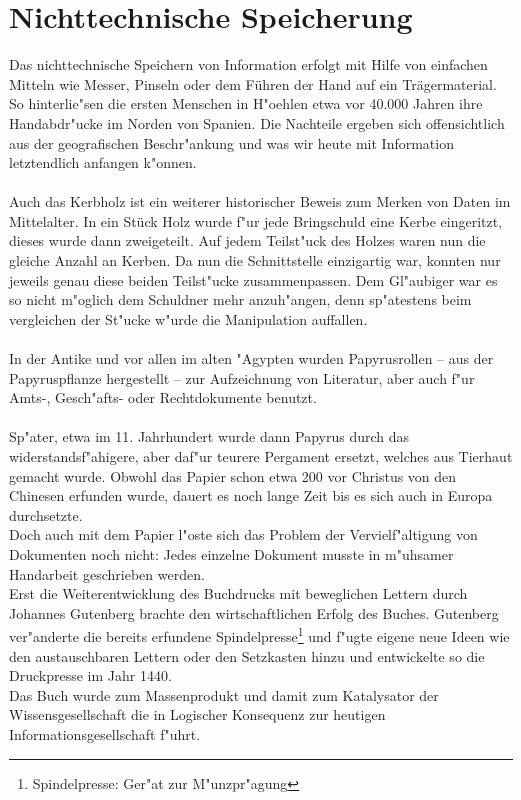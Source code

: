
\chapter{Nichttechnische Speicherung}
\label{ch:Nichttechnische Speicherung}
Das nichttechnische Speichern von Information erfolgt mit Hilfe von einfachen Mitteln wie Messer, Pinseln oder dem Führen der Hand auf ein Trägermaterial. So hinterlie"sen die ersten Menschen in H"oehlen etwa vor 40.000 Jahren ihre Handabdr"ucke im Norden von Spanien\cite{spiegel:hoehle}. Die Nachteile ergeben sich offensichtlich aus der geografischen Beschr"ankung und was wir heute mit Information letztendlich anfangen k"onnen.
\\
\\
Auch das Kerbholz ist ein weiterer historischer Beweis zum Merken von Daten im Mittelalter. In ein Stück Holz wurde f"ur jede Bringschuld eine Kerbe eingeritzt, dieses wurde dann zweigeteilt. Auf jedem Teilst"uck des Holzes waren nun die gleiche Anzahl an Kerben. Da nun die Schnittstelle einzigartig war, konnten nur jeweils genau diese beiden Teilst"ucke zusammenpassen. Dem Gl"aubiger war es so nicht m"oglich dem Schuldner mehr anzuh"angen, denn sp"atestens beim vergleichen der St"ucke w"urde die Manipulation auffallen.\cite{carlen:kerbholz} 
\\
\\
In der Antike und vor allen im alten "Agypten wurden Papyrusrollen – aus der Papyruspflanze hergestellt – zur Aufzeichnung von Literatur, aber auch f"ur Amts-, Gesch"afts- oder Rechtdokumente benutzt. 
\\
\\
Sp"ater, etwa im 11. Jahrhundert wurde dann Papyrus durch das widerstandsf"ahigere, aber daf"ur teurere Pergament ersetzt, welches aus Tierhaut gemacht wurde.
Obwohl das Papier schon etwa 200 vor Christus von den Chinesen erfunden wurde, dauert es noch lange Zeit bis es sich auch in Europa durchsetzte. 
\\
Doch auch mit dem Papier l"oste sich das Problem der Vervielf"altigung von Dokumenten noch nicht: 
Jedes einzelne Dokument musste in m"uhsamer Handarbeit geschrieben werden. 
\\
Erst die Weiterentwicklung des Buchdrucks mit beweglichen Lettern durch Johannes Gutenberg brachte den wirtschaftlichen Erfolg des Buches.
Gutenberg ver"anderte die bereits erfundene Spindelpresse\footnote[3]{Spindelpresse: Ger"at zur M"unzpr"agung} und f"ugte eigene neue Ideen wie den austauschbaren Lettern oder den Setzkasten hinzu und entwickelte so die Druckpresse im Jahr 1440.
\\
Das Buch wurde zum Massenprodukt und damit zum Katalysator der Wissensgesellschaft die in Logischer Konsequenz zur heutigen Informationsgesellschaft f"uhrt.


